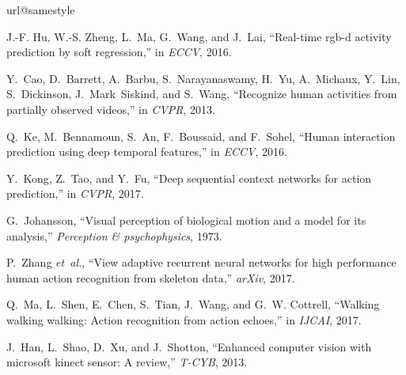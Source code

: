 \documentclass[10pt,twocolumn,letterpaper]{article}
\begin{document}
\begin{thebibliography}{10}
   \providecommand{\url}[1]{#1}
   \csname url@samestyle\endcsname
   \providecommand{\newblock}{\relax}
   \providecommand{\bibinfo}[2]{#2}
   \providecommand{\BIBentrySTDinterwordspacing}{\spaceskip=0pt\relax}
   \providecommand{\BIBentryALTinterwordstretchfactor}{4}
   \providecommand{\BIBentryALTinterwordspacing}{\spaceskip=\fontdimen2\font plus
   \BIBentryALTinterwordstretchfactor\fontdimen3\font minus
     \fontdimen4\font\relax}
   \providecommand{\BIBforeignlanguage}[2]{{\expandafter\ifx\csname l@#1\endcsname\relax
   \typeout{** WARNING: IEEEtran.bst: No hyphenation pattern has been}\typeout{** loaded for the language `#1'. Using the pattern for}\typeout{** the default language instead.}\else
   \language=\csname l@#1\endcsname
   \fi
   #2}}
   \providecommand{\BIBdecl}{\relax}
   \BIBdecl
   
   J.-F. Hu, W.-S. Zheng, L.~Ma, G.~Wang, and J.~Lai, ``Real-time rgb-d activity
     prediction by soft regression,'' in \emph{ECCV}, 2016.
   
   Y.~Cao, D.~Barrett, A.~Barbu, S.~Narayanaswamy, H.~Yu, A.~Michaux, Y.~Lin,
     S.~Dickinson, J.~Mark~Siskind, and S.~Wang, ``Recognize human activities from
     partially observed videos,'' in \emph{CVPR}, 2013.
   
   Q.~Ke, M.~Bennamoun, S.~An, F.~Boussaid, and F.~Sohel, ``Human interaction
     prediction using deep temporal features,'' in \emph{ECCV}, 2016.
   
   Y.~Kong, Z.~Tao, and Y.~Fu, ``Deep sequential context networks for action
     prediction,'' in \emph{CVPR}, 2017.
   
   G.~Johansson, ``Visual perception of biological motion and a model for its
     analysis,'' \emph{Perception \& psychophysics}, 1973.
   
   P.~Zhang \emph{et~al.}, ``View adaptive recurrent neural networks for high
     performance human action recognition from skeleton data,'' \emph{arXiv},
     2017.
   
   Q.~Ma, L.~Shen, E.~Chen, S.~Tian, J.~Wang, and G.~W. Cottrell, ``Walking
     walking walking: Action recognition from action echoes,'' in \emph{IJCAI},
     2017.
   
   J.~Han, L.~Shao, D.~Xu, and J.~Shotton, ``Enhanced computer vision with
     microsoft kinect sensor: A review,'' \emph{T-CYB}, 2013.
   

\end{thebibliography}
\end{document}
